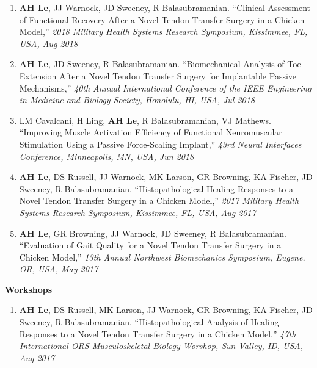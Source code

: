 \documentclass[10pt]{letter}
\begin{document}
\begin{justify}
\begin{enumerate}[leftmargin=*]
    \item \textbf{AH Le}, JJ Warnock, JD Sweeney, R Balasubramanian.
        ``Clinical Assessment of Functional Recovery After a Novel Tendon Transfer Surgery in a Chicken Model,''
        \textit{2018 Military Health Systems Research Symposium, Kissimmee, FL, USA, Aug 2018}
    
    \item \textbf{AH Le}, JD Sweeney, R Balasubramanian.
        ``Biomechanical Analysis of Toe Extension After a Novel Tendon Transfer Surgery for Implantable Passive Mechanisms,''
        \textit{40th Annual International Conference of the IEEE Engineering in Medicine and Biology Society, Honolulu, HI, USA, Jul 2018}
    
    \item LM Cavalcani, H Ling, \textbf{AH Le}, R Balasubramanian, VJ Mathews.
        ``Improving Muscle Activation Efficiency of Functional Neuromuscular Stimulation Using a Passive Force-Scaling Implant,''
        \textit{43rd Neural Interfaces Conference, Minneapolis, MN, USA, Jun 2018}
    
    \item \textbf{AH Le}, DS Russell, JJ Warnock, MK Larson, GR Browning, KA Fischer, JD Sweeney, R Balasubramanian.
        ``Histopathological Healing Responses to a Novel Tendon Transfer Surgery in a Chicken Model,''
        \textit{2017 Military Health Systems Research Symposium, Kissimmee, FL, USA, Aug 2017}
    
    \item \textbf{AH Le}, GR Browning, JJ Warnock, JD Sweeney, R Balasubramanian.
        ``Evaluation of Gait Quality for a Novel Tendon Transfer Surgery in a Chicken Model,''
        \textit{13th Annual Northwest Biomechanics Symposium, Eugene, OR, USA, May 2017}
\end{enumerate}
\end{justify}
\vspace{5pt}


\begin{center}
\textbf{Workshops} \\
\end{center}
\vspace{-5pt}
\begin{justify}
\begin{enumerate}[leftmargin=*]
    \item \textbf{AH Le}, DS Russell, MK Larson, JJ Warnock, GR Browning, KA Fischer, JD Sweeney, R Balasubramanian.
        ``Histopathological Analysis of Healing Responses to a Novel Tendon Transfer Surgery in a Chicken Model,''
        \textit{47th International ORS Musculoskeletal Biology Worshop, Sun Valley, ID, USA, Aug 2017}
\end{enumerate}
\end{justify}
\end{document}

